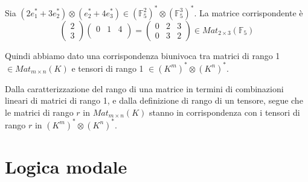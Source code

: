 \documentclass[10pt,a4paper,twoside]{book}
\begin{document}
\begin{example}
    Sia $(2 e_1^* + 3 e_2^*) \otimes (e_2^* + 4 e_3^*) \in (\mathbb{F}_5^2)^* \otimes (\mathbb{F}_5^3)^*$. La matrice corrispondente è
    \begin{equation*}
        \begin{pmatrix}
            2 \\
            3
        \end{pmatrix} \begin{pmatrix}
            0 & 1 & 4 \\
        \end{pmatrix} = \begin{pmatrix}
            0 & 2 & 3 \\
            0 & 3 & 2
        \end{pmatrix} \in Mat_{2 \times 3}(\mathbb{F}_5)
    \end{equation*}
\end{example}

Quindi abbiamo dato una corrispondenza biunivoca tra matrici di rango 1 $\in Mat_{m \times n}(K)$ e tensori di rango 1 $\in (K^m)^* \otimes (K^n)^*$.

Dalla caratterizzazione del rango di una matrice in termini di combinazioni lineari di matrici di rango 1, e dalla definizione di rango di un tensore, segue che le matrici di rango $r$ in $Mat_{m \times n}(K)$ stanno in corrispondenza con i tensori di rango $r$ in $(K^m)^* \otimes (K^n)^*$.

\newpage


\chapter{Logica modale}
\end{document}
